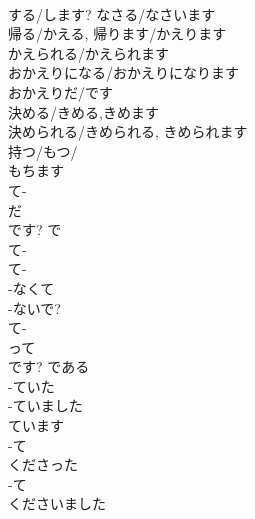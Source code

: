 \documentclass[8pt]{extreport}
\begin{document}
\begin{CJK}{UTF8}{min}
\\	する/します?	なさる/なさいます	
\\	帰る/かえる, 帰ります/かえります 
\\	かえられる/かえられます 
\\	おかえりになる/おかえりになります 
\\	おかえりだ/です	
\\	決める/きめる,きめます 
\\	決められる/きめられる, きめられます	
\\	持つ/もつ/
\\	もちます	
\\	て-
\\	だ 
\\	です?	で	
\\	て-
\\	て-
\\	-なくて 
\\	-ないで?	
\\	て-
\\	って 
\\	です?	である	
\\	-ていた		
\\	-ていました		
\\	ています		
\\	-て 
\\	くださった		
\\	-て 
\\	くださいました		
\end{CJK}
\end{document}
